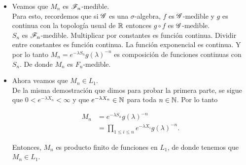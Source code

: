     \begin{itemize}
        \item 
            Veamos que $M_n$ es $\mathscr{F}_n$-medible.\\
            
            Para esto, recordemos que si $\mathscr{G}$ es una $\sigma$-algebra, $f$ es $\mathscr{G}$-medible y $g$ es continua
            con la topología usual de $\mathbb{R}$ entonces $g \circ f$ es $\mathscr{G}$-medible.\\
            
            $S_n$ es $\mathscr{F}_n$-medible. Multiplicar por constantes es función continua. Dividir entre constantes 
            es función continua. La función exponencial es continua. Y por lo tanto $M_n=e^{-\lambda S_n}g(\lambda)^{-n}$ 
            es composición de funciones continuas con $S_n$. De donde $M_n$ es $F_n$-medible.\\
         
        \item 
            Ahora veamos que $M_n \in L_1$.\\
            
            De la misma demostración que dimos para probar la primera parte, se sigue 
            que $0 < e^{-\lambda X_n} < \infty$ y que $e^{-\lambda X_n} \in \mathbb{N}$ para toda $n \in \mathbb{N}$. Por lo tanto
            
            \begin{align}
                M_n         &=      e^{-\lambda S_n}g(\lambda)^{-n} \\
                            &=      \prod_{1 \leq i \leq n} e^{-\lambda X_i} g(\lambda)^{-n}. 
            \end{align}
            
            Entonces, $M_n$ es producto finito de funciones en $L_1$, de donde tenemos que $M_n \in L_1$.
    \end{itemize}